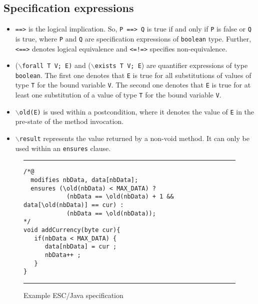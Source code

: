 \documentclass[a4paper]{llncs}
\begin{document}
\subsection{Specification expressions}
\begin{itemize}
\item{\texttt{==>}} is the logical implication. So, \texttt{P
==> Q} is true if and only if \texttt{P} is false or \texttt{Q} is
true, where \texttt{P} and \texttt{Q} are specification expressions of 
\texttt{boolean} type. Further, \texttt{<==>} denotes
logical equivalence and \texttt{<=!=>} specifies non-equivalence.

\item {($\backslash$\texttt{forall T V; E)} and
($\backslash$\texttt{exists T V; E})} are quantifier expressions of
type \texttt{boolean}.  The first one denotes that \texttt{E} is true
for all substitutions of values of type \texttt{T} for the bound
variable \texttt{V}. The second one denotes that \texttt{E} is true
for at least one substitution of a value of type \texttt{T} for the bound
variable \texttt{V}.

\item{\texttt{$\backslash$old(E)}} is used within a postcondition, where it denotes the value of \texttt{E} in the pre-state of the method invocation.

\item {\tt$\backslash$result} represents the value returned by
a non-void method. It can only be used within an
\texttt{ensures} clause.
\end{itemize}


\begin{figure}[t]
\rule{\linewidth}{0.3mm}
\begin{verbatim}
/*@
  modifies nbData, data[nbData];
  ensures (\old(nbData) < MAX_DATA) ?
            (nbData == \old(nbData) + 1 && data[\old(nbData)] == cur) :
            (nbData == \old(nbData));
*/
void addCurrency(byte cur){
   if(nbData < MAX_DATA) {
      data[nbData] = cur ;
      nbData++ ;
   }
}
\end{verbatim}
\caption{Example ESC/Java specification}
\label{fig-add-cur}
\rule{\linewidth}{0.3mm}
\end{figure}
\end{document}
